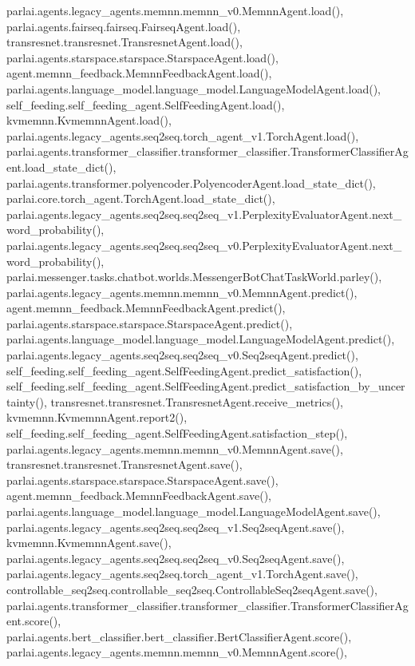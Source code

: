 parlai.\+agents.\+legacy\+\_\+agents.\+memnn.\+memnn\+\_\+v0.\+Memnn\+Agent.\+load(), parlai.\+agents.\+fairseq.\+fairseq.\+Fairseq\+Agent.\+load(), transresnet.\+transresnet.\+Transresnet\+Agent.\+load(), parlai.\+agents.\+starspace.\+starspace.\+Starspace\+Agent.\+load(), agent.\+memnn\+\_\+feedback.\+Memnn\+Feedback\+Agent.\+load(), parlai.\+agents.\+language\+\_\+model.\+language\+\_\+model.\+Language\+Model\+Agent.\+load(), self\+\_\+feeding.\+self\+\_\+feeding\+\_\+agent.\+Self\+Feeding\+Agent.\+load(), kvmemnn.\+Kvmemnn\+Agent.\+load(), parlai.\+agents.\+legacy\+\_\+agents.\+seq2seq.\+torch\+\_\+agent\+\_\+v1.\+Torch\+Agent.\+load(), parlai.\+agents.\+transformer\+\_\+classifier.\+transformer\+\_\+classifier.\+Transformer\+Classifier\+Agent.\+load\+\_\+state\+\_\+dict(), parlai.\+agents.\+transformer.\+polyencoder.\+Polyencoder\+Agent.\+load\+\_\+state\+\_\+dict(), parlai.\+core.\+torch\+\_\+agent.\+Torch\+Agent.\+load\+\_\+state\+\_\+dict(), parlai.\+agents.\+legacy\+\_\+agents.\+seq2seq.\+seq2seq\+\_\+v1.\+Perplexity\+Evaluator\+Agent.\+next\+\_\+word\+\_\+probability(), parlai.\+agents.\+legacy\+\_\+agents.\+seq2seq.\+seq2seq\+\_\+v0.\+Perplexity\+Evaluator\+Agent.\+next\+\_\+word\+\_\+probability(), parlai.\+messenger.\+tasks.\+chatbot.\+worlds.\+Messenger\+Bot\+Chat\+Task\+World.\+parley(), parlai.\+agents.\+legacy\+\_\+agents.\+memnn.\+memnn\+\_\+v0.\+Memnn\+Agent.\+predict(), agent.\+memnn\+\_\+feedback.\+Memnn\+Feedback\+Agent.\+predict(), parlai.\+agents.\+starspace.\+starspace.\+Starspace\+Agent.\+predict(), parlai.\+agents.\+language\+\_\+model.\+language\+\_\+model.\+Language\+Model\+Agent.\+predict(), parlai.\+agents.\+legacy\+\_\+agents.\+seq2seq.\+seq2seq\+\_\+v0.\+Seq2seq\+Agent.\+predict(), self\+\_\+feeding.\+self\+\_\+feeding\+\_\+agent.\+Self\+Feeding\+Agent.\+predict\+\_\+satisfaction(), self\+\_\+feeding.\+self\+\_\+feeding\+\_\+agent.\+Self\+Feeding\+Agent.\+predict\+\_\+satisfaction\+\_\+by\+\_\+uncertainty(), transresnet.\+transresnet.\+Transresnet\+Agent.\+receive\+\_\+metrics(), kvmemnn.\+Kvmemnn\+Agent.\+report2(), self\+\_\+feeding.\+self\+\_\+feeding\+\_\+agent.\+Self\+Feeding\+Agent.\+satisfaction\+\_\+step(), parlai.\+agents.\+legacy\+\_\+agents.\+memnn.\+memnn\+\_\+v0.\+Memnn\+Agent.\+save(), transresnet.\+transresnet.\+Transresnet\+Agent.\+save(), parlai.\+agents.\+starspace.\+starspace.\+Starspace\+Agent.\+save(), agent.\+memnn\+\_\+feedback.\+Memnn\+Feedback\+Agent.\+save(), parlai.\+agents.\+language\+\_\+model.\+language\+\_\+model.\+Language\+Model\+Agent.\+save(), parlai.\+agents.\+legacy\+\_\+agents.\+seq2seq.\+seq2seq\+\_\+v1.\+Seq2seq\+Agent.\+save(), kvmemnn.\+Kvmemnn\+Agent.\+save(), parlai.\+agents.\+legacy\+\_\+agents.\+seq2seq.\+seq2seq\+\_\+v0.\+Seq2seq\+Agent.\+save(), parlai.\+agents.\+legacy\+\_\+agents.\+seq2seq.\+torch\+\_\+agent\+\_\+v1.\+Torch\+Agent.\+save(), controllable\+\_\+seq2seq.\+controllable\+\_\+seq2seq.\+Controllable\+Seq2seq\+Agent.\+save(), parlai.\+agents.\+transformer\+\_\+classifier.\+transformer\+\_\+classifier.\+Transformer\+Classifier\+Agent.\+score(), parlai.\+agents.\+bert\+\_\+classifier.\+bert\+\_\+classifier.\+Bert\+Classifier\+Agent.\+score(), parlai.\+agents.\+legacy\+\_\+agents.\+memnn.\+memnn\+\_\+v0.\+Memnn\+Agent.\+score(), 